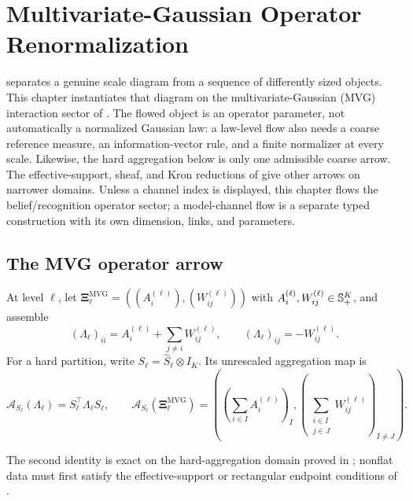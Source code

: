 \chapter{Multivariate-Gaussian Operator Renormalization}
\label{ch:gaussian-renormalization}

 separates a genuine scale diagram from a sequence
of differently sized objects.  This chapter instantiates that diagram on the
multivariate-Gaussian (MVG) interaction sector of
.  The flowed object is an operator
parameter, not automatically a normalized Gaussian law: a law-level flow
also needs a coarse reference measure, an information-vector rule, and a
finite normalizer at every scale.  Likewise, the hard aggregation below is
only one admissible coarse arrow.  The effective-support, sheaf, and Kron
reductions of  give other arrows on narrower
domains. Unless a channel index is displayed, this chapter flows the
belief/recognition operator sector; a model-channel flow is a separate typed
construction with its own dimension, links, and parameters. 

\section{The MVG operator arrow}
\label{sec:grg-operator-arrow}

At level \(\ell\), let
\(\boldsymbol\Xi_\ell^{\mathrm{MVG}}
=((A_i^{(\ell)}),(W_{ij}^{(\ell)}))\) with
\(A_i^{(\ell)},W_{ij}^{(\ell)}\in\mathbb S_{+}^K\), and assemble
\begin{equation}
(\Lambda_\ell)_{ii}
 =A_i^{(\ell)}+\sum_{j\ne i}W_{ij}^{(\ell)},
\qquad
(\Lambda_\ell)_{ij}=-W_{ij}^{(\ell)}.
\label{eq:grg-family}
\end{equation}
For a hard partition, write
\(S_\ell=\widehat S_\ell\otimes I_K\).  Its unrescaled aggregation map is
\begin{equation}
\mathcal A_{S_\ell}(\Lambda_\ell)
 =S_\ell^\top\Lambda_\ell S_\ell,
\qquad
\mathcal A_{S_\ell}(\boldsymbol\Xi_\ell^{\mathrm{MVG}})
 =\left(
 \left(\sum_{i\in I}A_i^{(\ell)}\right)_I,
 \left(\sum_{\substack{i\in I\\j\in J}}W_{ij}^{(\ell)}\right)_{I\ne J}
 \right).
\label{eq:grg-aggregation}
\end{equation}

The second identity is exact on the hard-aggregation domain proved in
; nonflat data must first satisfy the
effective-support or rectangular endpoint conditions of
. 

